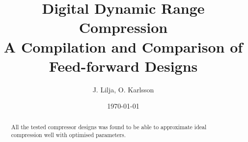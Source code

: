 \documentclass[]{article}
\begin{document}
\newcommand{\rootdir}{.}

\title{Digital Dynamic Range Compression \\ \Large A Compilation and Comparison of Feed-forward Designs}
\author{J. Lilja, O. Karlsson}
\date{\today}
\maketitle

\begin{abstract}
All the tested compressor designs was found to be able to approximate ideal compression well with optimised parameters.
\end{abstract}
\clearpage

\tableofcontents
\clearpage


\clearpage












\FloatBarrier
\clearpage


\end{document}
